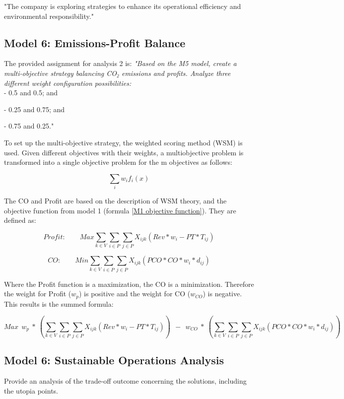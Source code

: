 "The company is exploring strategies to enhance its operational efficiency and environmental responsibility."

\vspace{0.5cm}
\subsection{Model 6: Emissions-Profit Balance}
The provided assignment for analysis 2 is: \textit{"Based on the M5 model, create a multi-objective strategy balancing CO₂ emissions and profits. Analyze three different weight configuration possibilities:}\\

\qquad - 0.5 and 0.5; and

\qquad - 0.25 and 0.75; and 

\qquad - 0.75 and 0.25." 

\vspace{0.5cm}
To set up the multi-objective strategy, the weighted scoring method (WSM) is used. Given different objectives with their weights, a multiobjective problem is transformed into a single objective problem for the m objectives as follows:

\begin{equation} 
\sum_{i} w_i f_i(x)
\label{F m6 wsm example}
\end{equation}

The CO and Profit are based on the description of WSM theory, and the objective function from model 1 (formula \ref{M1 objective function}). They are defined as:

\begin{equation} 
Profit: \qquad Max \sum_{k\in V}    \sum_{i\in P}  \sum_{j\in P} X_{ijk} (Rev * w_i - PT * T_{ij}) 
\label{M6 Profit}
\end{equation}

\begin{equation} 
CO: \qquad Min \sum_{k\in V}    \sum_{i\in P}  \sum_{j\in P} X_{ijk} (PCO * CO * w_i *d_{ij})
\label{M6 CO}
\end{equation}

Where the Profit function is a maximization, the CO is a minimization. Therefore the weight for Profit ($w_p$) is positive and the weight for CO ($w_{CO}$) is negative.
This results is the summed formula:

\begin{equation} 
Max \ \ w_p \ * \ (\sum_{k\in V}    \sum_{i\in P}  \sum_{j\in P} X_{ijk} (Rev * w_i - PT * T_{ij}) ) \ \ - \ \ w_{CO} \ * \ (\sum_{k\in V}    \sum_{i\in P}  \sum_{j\in P} X_{ijk} (PCO * CO * w_i *d_{ij}))
\label{M6 objective function}
\end{equation}

\vspace{0.5cm}
\subsection{Model 6: Sustainable Operations Analysis}
Provide an analysis of the trade-off outcome concerning the solutions, including the utopia points.

\newpage

